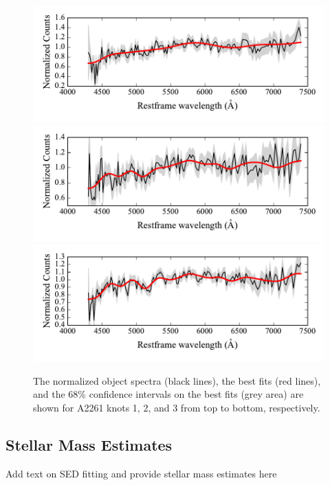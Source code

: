 \documentclass[useAMS,usenatbib]{emulateapj}
\newcommand{\fixme}[1]{{\color{red} #1 }}
\begin{document}
\begin{figure}[!t]
\begin{center}
\includegraphics[width=1.0\columnwidth]{figs/knot1_pub_spec.pdf}
\includegraphics[width=1.0\columnwidth]{figs/knot2_pub_spec.pdf}
\includegraphics[width=1.0\columnwidth]{figs/knot3_pub_spec.pdf}
\end{center}
\caption{The normalized object spectra (black lines), the best fits (red lines), and the 68\% confidence intervals on the best fits (grey area) are shown for A2261 knots 1, 2, and 3 from top to bottom, respectively.}
\label{spectrafits}
\end{figure}

\subsection{Stellar Mass Estimates}

\fixme{Add text on SED fitting and provide stellar mass estimates here}
\end{document}
